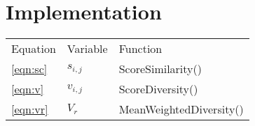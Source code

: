 \documentclass[a4paper]{article}
\begin{document}
\appendix
\section{Implementation}
\begin{tabular}{lll}\hline
  Equation        & Variable    & Function                  \\
  \ref{eqn:sc}    & $s_{i,j}$    & ScoreSimilarity()         \\
  \ref{eqn:v}     & $v_{i,j}$    & ScoreDiversity()          \\
  \ref{eqn:vr}    & $V_r$       & MeanWeightedDiversity()   \\ 
\end{tabular}
\end{document}
